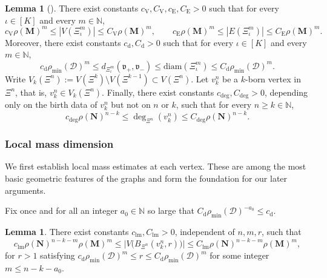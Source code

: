 \documentclass{article}
\theoremstyle{plain}
\theoremstyle{definition}
\newtheorem{lemma}[theorem]{Lemma}
\newcommand{\dist}{\mathrm{d}}
\newcommand{\diam}{\mathrm{diam}}
\begin{document}
\begin{lemma}[\cite{li2024on,neroli2024fractal}]\label{lem:basic_prop}
There exist constants $c_{\mathrm V},C_{\mathrm V},c_{\mathrm E},C_{\mathrm E}>0$ such that for every $\iota\in[K]$ and every $m\in\mathbb N$,
\[
c_{\mathrm V}\rho(\mathbf M)^m \le |V(\Xi_\iota^m)| \le C_{\mathrm V}\rho(\mathbf M)^m,
\qquad
c_{\mathrm E}\rho(\mathbf M)^m \le |E(\Xi_\iota^m)| \le C_{\mathrm E}\rho(\mathbf M)^m.
\]
Moreover, there exist constants $c_{\dist},C_{\dist}>0$ such that for every $\iota\in[K]$ and every $m\in\mathbb N$,
\[
c_{\dist}\rho_{\min}(\mathcal D)^m \le d_{\Xi_\iota^m}(\mathfrak v_+,\mathfrak v_-)
\le
\diam(\Xi_\iota^m)\le C_{\dist}\rho_{\min}(\mathcal D)^m.
\]
Write $V_k(\Xi^n):=V(\Xi^k)\setminus V(\Xi^{k-1})\subset V(\Xi^n)$.
Let $v_k^n$ be a $k$-born vertex in $\Xi^n$, that is, $v_k^n\in V_k(\Xi^n)$.
Finally, there exist constants $c_{\deg},C_{\deg}>0$, depending only on the birth data of $v_k^n$ but not on $n$ or $k$, such that for every $n\ge k\in\mathbb N$,
\[
c_{\deg}\rho(\mathbf N)^{n-k}
\le
\deg_{\Xi^{n}}(v_k^n)
\le
C_{\deg}\rho(\mathbf N)^{n-k}.
\]
\end{lemma}

\subsubsection*{Local mass dimension}

We first establish local mass estimates at each vertex.
These are among the most basic geometric features of the graphs and form the foundation for our later arguments.

Fix once and for all an integer $a_0\in\mathbb N$ so large that $C_{\dist}\rho_{\min}(\mathcal D)^{-a_0}\le c_{\dist}$.

\begin{lemma}\label{lem:ball_volume_k_born}
There exist constants $c_{\mathrm{lm}},C_{\mathrm{lm}}>0$, independent of $n,m,r$, such that
\[
c_{\mathrm{lm}} \rho(\mathbf N)^{n-k-m} \rho(\mathbf M)^m
\le
\big|V\big(B_{\Xi^n}(v_k^n,r)\big)\big|
\le
C_{\mathrm{lm}} \rho(\mathbf N)^{n-k-m} \rho(\mathbf M)^m,
\]
for $r>1$ satisfying
$
c_{\dist} \rho_{\min}(\mathcal D)^m
\le
r
\le
C_{\dist} \rho_{\min}(\mathcal D)^m
$
for some integer $m\le n-k{}-a_0$.
\end{lemma}
\end{document}
